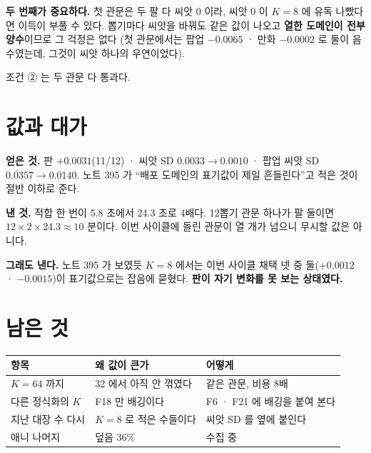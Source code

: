 \documentclass[11pt]{article}
\begin{document}
\textbf{두 번째가 중요하다.} 첫 관문은 두 팔 다 씨앗 0 이라, 씨앗 0 이
$K{=}8$ 에 유독 나빴다면 이득이 부풀 수 있다. 뽑기마다 씨앗을 바꿔도
같은 값이 나오고 \textbf{열한 도메인이 전부 양수}이므로 그 걱정은 없다
(첫 관문에서는 팝업 $-0.0065$ · 만화 $-0.0002$ 로 둘이 음수였는데, 그것이
씨앗 하나의 우연이었다).

조건 ② 는 두 관문 다 통과다.

\section{값과 대가}

\textbf{얻은 것.} 판 $+0.0031$(11/12) · 씨앗 SD $0.0033 \to 0.0010$ ·
팝업 씨앗 SD $0.0357 \to 0.0140$. 노트 395 가 ``배포 도메인의 표기값이
제일 흔들린다''고 적은 것이 절반 이하로 준다.

\textbf{낸 것.} 적합 한 번이 5.8 초에서 24.3 초로 4배다. 12뽑기 관문
하나가 팔 둘이면 $12 \times 2 \times 24.3 \approx 10$ 분이다. 이번 사이클에
돌린 관문이 열 개가 넘으니 무시할 값은 아니다.

\textbf{그래도 낸다.} 노트 395 가 보였듯 $K{=}8$ 에서는 이번 사이클 채택
넷 중 둘($+0.0012$ · $-0.0015$)이 표기값으로는 잡음에 묻혔다. \textbf{판이
자기 변화를 못 보는 상태였다.}

\section{남은 것}

\begin{center}
\begin{tabular}{lll}
\hline
항목 & 왜 값이 큰가 & 어떻게 \\
\hline
$K{=}64$ 까지 & 32 에서 아직 안 꺾였다 & 같은 관문, 비용 8배 \\
다른 정식화의 $K$ & F18 만 배깅이다 & F6 · F21 에 배깅을 붙여 본다 \\
지난 대장 수 다시 & $K{=}8$ 로 적은 수들이다 & 씨앗 SD 를 옆에 붙인다 \\
애니 나머지 & 덮음 36\% & 수집 중 \\
\hline
\end{tabular}
\end{center}
\end{document}
